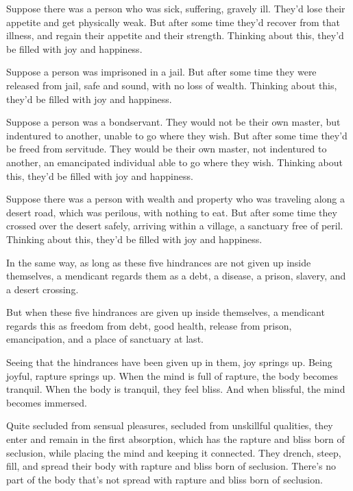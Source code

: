 \documentclass[12pt,openany]{book}%
\begin{document}
Suppose there was a person who was sick, suffering, gravely ill. They’d lose their appetite and get physically weak. But after some time they’d recover from that illness, and regain their appetite and their strength. Thinking about this, they’d be filled with joy and happiness. 

Suppose a person was imprisoned in a jail. But after some time they were released from jail, safe and sound, with no loss of wealth. Thinking about this, they’d be filled with joy and happiness. 

Suppose a person was a bondservant. They would not be their own master, but indentured to another, unable to go where they wish. But after some time they’d be freed from servitude. They would be their own master, not indentured to another, an emancipated individual able to go where they wish. Thinking about this, they’d be filled with joy and happiness. 

Suppose there was a person with wealth and property who was traveling along a desert road, which was perilous, with nothing to eat. But after some time they crossed over the desert safely, arriving within a village, a sanctuary free of peril. Thinking about this, they’d be filled with joy and happiness. 

In the same way, as long as these five hindrances are not given up inside themselves, a mendicant regards them as a debt, a disease, a prison, slavery, and a desert crossing. 

But when these five hindrances are given up inside themselves, a mendicant regards this as freedom from debt, good health, release from prison, emancipation, and a place of sanctuary at last. 

Seeing that the hindrances have been given up in them, joy springs up. Being joyful, rapture springs up. When the mind is full of rapture, the body becomes tranquil. When the body is tranquil, they feel bliss. And when blissful, the mind becomes immersed. 

Quite secluded from sensual pleasures, secluded from unskillful qualities, they enter and remain in the first absorption, which has the rapture and bliss born of seclusion, while placing the mind and keeping it connected. They drench, steep, fill, and spread their body with rapture and bliss born of seclusion. There’s no part of the body that’s not spread with rapture and bliss born of seclusion. 
\end{document}
